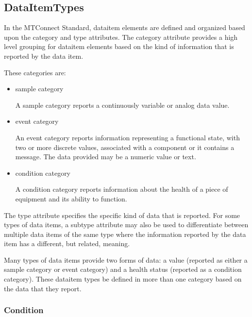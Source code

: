 \subsection{DataItemTypes} \label{sec:DataItemTypes}

In the MTConnect Standard, \gls{dataitem} elements are defined and organized based upon the \gls{category} and \gls{type} attributes.  The \gls{category} attribute provides a high level grouping for \gls{dataitem} elements based on the kind of information that is reported by the data item.

These categories are:

\begin{itemize}

\item \gls{sample category}

A \gls{sample category} reports a continuously variable or analog data value. 

\item \gls{event category}

An \gls{event category} reports information representing a functional state, with two or more discrete values, associated with a component or it contains a message.  The data provided may be a numeric value or text.

\item \gls{condition category}

A \gls{condition category} reports information about the health of a piece of equipment and its ability to function.
\end{itemize}

The \gls{type} attribute specifies the specific kind of data that is reported.   For some types of data items, a \gls{subtype} attribute may also be used to differentiate between multiple data items of the same \gls{type} where the information reported by the data item has a different, but related, meaning.

Many types of data items provide two forms of data: a value (reported as either a \gls{sample category} or \gls{event category}) and a health status (reported as a \gls{condition category}).  These \gls{dataitem} types \may be defined in more than one \gls{category} based on the data that they report.



\subsubsection{Condition}
  \label{sec:Condition}


